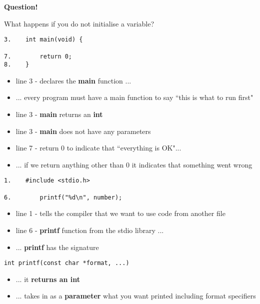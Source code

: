 \documentclass{beamer}
\begin{document}
\begin{frame}
\begin{center}
\textbf{Question! }
\end{center}
\begin{center}
{What happens if you do not initialise a variable?}
\end{center}
\end{frame}

\begin{frame}[fragile]
\begin{block}{}
\begin{lstlisting}   
3.    int main(void) {

7.        return 0;
8.    }
\end{lstlisting}
\end{block}
\begin{itemize}
\item line 3 - declares the \textbf{main} function ...
\item ... every program must have a main function to say ``this is what to run first"
\item line 3 - \textbf{main} returns an \textbf{int}
\item line 3 - \textbf{main} does not have any parameters
\item line 7 - return 0 to indicate that ``everything is OK"...
\item ... if we return anything other than 0 it indicates that something went wrong
\end{itemize}
\end{frame}

\begin{frame}[fragile]
\begin{block}{}
\begin{lstlisting}[firstnumber=1]
1.    #include <stdio.h>

6.        printf("%d\n", number);
\end{lstlisting}
\end{block}
\begin{itemize}
\item line 1 - tells the compiler that we want to use code from another file
\item line 6 - \textbf{printf} function from the stdio library ...
\item ... \textbf{printf} has the signature 
\end{itemize}
\begin{block}{}
\begin{lstlisting}[firstnumber=1]
int printf(const char *format, ...)
\end{lstlisting}
\end{block}
\begin{itemize}
\item ... it \textbf{returns an int}
\item ... takes in as a \textbf{parameter} what you want printed including format specifiers
\end{itemize}
\end{frame}
\end{document}
